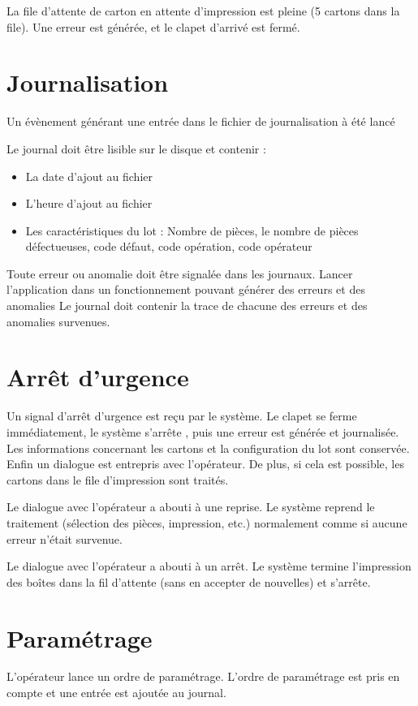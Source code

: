 {La file d'attente de carton en attente d'impression est pleine (5 cartons dans la file).}
{Une erreur est générée, et le clapet d'arrivé est fermé.}

\section{Journalisation}
{Un évènement générant une entrée dans le fichier de journalisation à été lancé}
{Le journal doit être lisible sur le disque et contenir :
\begin{itemize}
	\item La date d'ajout au fichier 
	\item L'heure d'ajout au fichier
	\item Les caractéristiques du lot : Nombre de pièces, le nombre de pièces défectueuses, code défaut, code opération, code opérateur
\end{itemize}
}

{Toute erreur ou anomalie doit être signalée dans les journaux.}
{Lancer l'application dans un fonctionnement pouvant générer des erreurs et des anomalies}
{Le journal doit contenir la trace de chacune des erreurs et des anomalies survenues.}

\section{Arrêt d'urgence}
{Un signal d'arrêt d'urgence est reçu par le système.}
{Le clapet se ferme immédiatement, le système s'arrête , puis une erreur est générée et journalisée. Les informations concernant les cartons et la configuration du lot sont conservée.
Enfin un dialogue est entrepris avec l'opérateur. De plus, si cela est possible, les cartons dans le file d'impression sont traités.}

{Le dialogue avec l'opérateur a abouti à une reprise.}
{Le système reprend le traitement (sélection des pièces, impression, etc.) normalement comme si aucune erreur n'était survenue.}

{Le dialogue avec l'opérateur a abouti à un arrêt.}
{Le système termine l'impression des boîtes dans la fil d'attente (sans en accepter de nouvelles) et s'arrête.}

\section{Paramétrage}
{L'opérateur lance un ordre de paramétrage.}
{L'ordre de paramétrage est pris en compte et une entrée est ajoutée au journal.}

